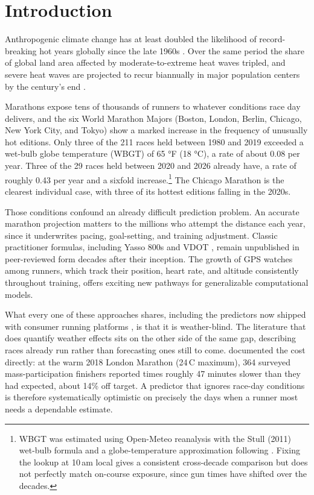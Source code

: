 \documentclass[11pt]{article}
\renewcommand{\_}{\textunderscore\allowbreak}
\begin{document}

\section{Introduction}

Anthropogenic climate change has at least doubled the likelihood of record-breaking hot years globally since the late 1960s \citep{king2017}. Over the same period the share of global land area affected by moderate-to-extreme heat waves tripled, and severe heat waves are projected to recur biannually in major population centers by the century's end \citep{russo2014}.

Marathons expose tens of thousands of runners to whatever conditions race day delivers, and the six World Marathon Majors (Boston, London, Berlin, Chicago, New York City, and Tokyo) show a marked increase in the frequency of unusually hot editions. Only three of the 211 races held between 1980 and 2019 exceeded a wet-bulb globe temperature (WBGT) of 65 °F (18 °C), a rate of about 0.08 per year. Three of the 29 races held between 2020 and 2026 already have, a rate of roughly 0.43 per year and a sixfold increase.\footnote{WBGT was estimated using Open-Meteo reanalysis with the Stull (2011) wet-bulb formula and a globe-temperature approximation following \citet{hunter1999}. Fixing the lookup at 10\,am local gives a consistent cross-decade comparison but does not perfectly match on-course exposure, since gun times have shifted over the decades.} The Chicago Marathon is the clearest individual case, with three of its hottest editions falling in the 2020s.

Those conditions confound an already difficult prediction problem. An accurate marathon projection matters to the millions who attempt the distance each year, since it underwrites pacing, goal-setting, and training adjustment. Classic practitioner formulas, including Yasso 800s and VDOT \citep{yasso2008life, gaudette2012yasso, daniels2013running}, remain unpublished in peer-reviewed form decades after their inception. The growth of GPS watches among runners, which track their position, heart rate, and altitude consistently throughout training, offers exciting new pathways for generalizable computational models. 

What every one of these approaches shares, including the predictors now shipped with consumer running platforms \citep{garmin_race_predictor, strava_performance_predictions}, is that it is weather-blind. The literature that does quantify weather effects sits on the other side of the same gap, describing races already run rather than forecasting ones still to come. \citet{vernon2021} documented the cost directly: at the warm 2018 London Marathon (24\,\textdegree C maximum), 364 surveyed mass-participation finishers reported times roughly 47 minutes slower than they had expected, about 14\% off target. A predictor that ignores race-day conditions is therefore systematically optimistic on precisely the days when a runner most needs a dependable estimate.
\end{document}
